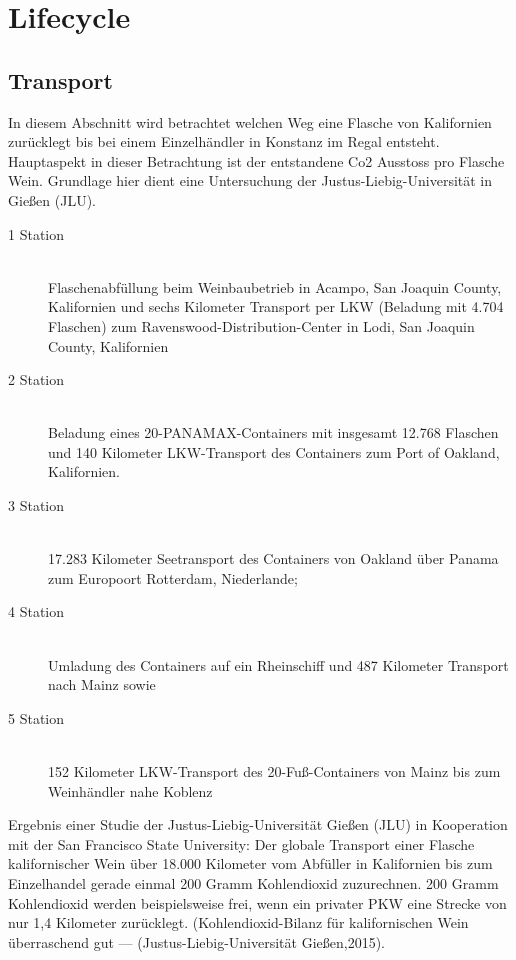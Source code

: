 \section{Lifecycle}
\subsection{Transport}
In diesem Abschnitt wird betrachtet welchen Weg eine Flasche von Kalifornien zurücklegt bis bei einem Einzelhändler in Konstanz im Regal entsteht. Hauptaspekt in dieser Betrachtung ist der entstandene Co2 Ausstoss pro Flasche Wein. Grundlage hier dient eine Untersuchung der Justus-Liebig-Universität in Gießen (JLU). 
\begin{description}
	\item[1 Station]\hfill \\
	Flaschenabfüllung beim Weinbaubetrieb in Acampo, San Joaquin County, 			Kalifornien und sechs Kilometer Transport per LKW (Beladung mit 4.704 			Flaschen) zum Ravenswood-Distribution-Center in Lodi, San Joaquin 				County, Kalifornien
	\item[2 Station]\hfill \\
	Beladung eines 20-PANAMAX-Containers mit insgesamt 12.768 Flaschen 			und 140 Kilometer LKW-Transport des Containers zum Port of Oakland, 			Kalifornien.
	\item[3 Station]\hfill \\
		17.283 Kilometer Seetransport des Containers von Oakland über Panama 			zum Europoort Rotterdam, Niederlande;
	\item[4 Station]\hfill \\
		Umladung des Containers auf ein Rheinschiff und 487 Kilometer Transport 			nach Mainz sowie	
	\item[5 Station]\hfill \\ 
	152 Kilometer LKW-Transport des 20-Fuß-Containers von Mainz bis zum 			Weinhändler nahe Koblenz
\end{description}

Ergebnis einer Studie der Justus-Liebig-Universität Gießen (JLU) in Kooperation mit der San Francisco State University: Der globale Transport einer Flasche kalifornischer Wein über 18.000 Kilometer vom Abfüller in Kalifornien bis zum Einzelhandel gerade einmal 200 Gramm Kohlendioxid zuzurechnen. 200 Gramm Kohlendioxid werden beispielsweise frei, wenn ein privater PKW eine Strecke von nur 1,4 Kilometer zurücklegt.  (Kohlendioxid-Bilanz für kalifornischen Wein überraschend gut — (Justus-Liebig-Universität Gießen,2015). 


